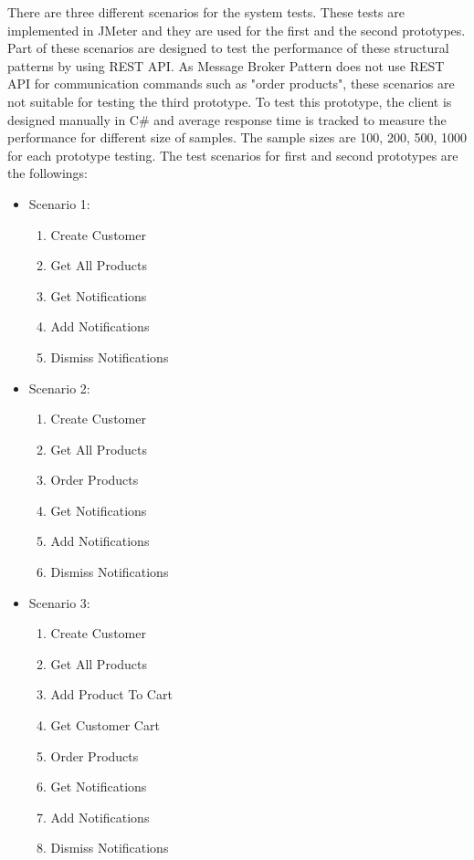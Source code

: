\documentclass{article}
\begin{document}
There are three different scenarios for the system tests. These tests are implemented in JMeter and they are used for the first and the second prototypes. Part of these scenarios are designed to test the performance of these structural patterns by using REST API.  As Message Broker Pattern does not use REST API for communication commands such as "order products", these scenarios are not suitable for testing the third prototype. To test this prototype, the client is designed manually in C\# and average response time is tracked to measure the performance for different size of samples. 
The sample sizes are 100, 200, 500, 1000 for each prototype testing. The test scenarios for first and second prototypes are the followings:


\begin{itemize}
    \item Scenario 1: 
    \begin{enumerate}
        \item Create Customer
        \item Get All Products
        \item Get Notifications
        \item Add Notifications
        \item Dismiss Notifications
    \end{enumerate}
    \item Scenario 2: 
    \begin{enumerate}
        \item Create Customer
        \item Get All Products
        \item Order Products
        \item Get Notifications
        \item Add Notifications
        \item Dismiss Notifications
    \end{enumerate}
     \item Scenario 3: 
    \begin{enumerate}
        \item Create Customer
        \item Get All Products
        \item Add Product To Cart
        \item Get Customer Cart
        \item Order Products
        \item Get Notifications
        \item Add Notifications
        \item Dismiss Notifications
    \end{enumerate}
\end{itemize}
\end{document}
